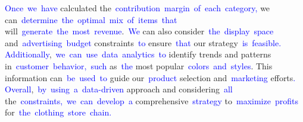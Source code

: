 \documentclass{article}
\begin{document}
\begin{tcolorbox}[colframe=black,colback=white]
{}\textcolor{blue}{Once}\textcolor{blue}{~we}\textcolor{blue}{~have} calculated the\textcolor{blue}{~contribution}\textcolor{blue}{~margin}\textcolor{blue}{~of}\textcolor{blue}{~each}\textcolor{blue}{~category}\textcolor{blue}{,} we can\textcolor{blue}{~determine}\textcolor{blue}{~the}\textcolor{blue}{~optimal}\textcolor{blue}{~mix}\textcolor{blue}{~of}\textcolor{blue}{~items}\textcolor{blue}{~that} will\textcolor{blue}{~generate}\textcolor{blue}{~the}\textcolor{blue}{~most}\textcolor{blue}{~revenue}.\textcolor{blue}{~We} can also consider\textcolor{blue}{~the}\textcolor{blue}{~display}\textcolor{blue}{~space} and\textcolor{blue}{~advertising}\textcolor{blue}{~budget} constraints\textcolor{blue}{~to} ensure\textcolor{blue}{~that} our strategy\textcolor{blue}{~is}\textcolor{blue}{~feasible}\textcolor{blue}{.
}\textcolor{blue}{Additionally},\textcolor{blue}{~we}\textcolor{blue}{~can}\textcolor{blue}{~use}\textcolor{blue}{~data}\textcolor{blue}{~analytics}\textcolor{blue}{~to} identify trends and patterns in\textcolor{blue}{~customer}\textcolor{blue}{~behavior}\textcolor{blue}{,}\textcolor{blue}{~such} as\textcolor{blue}{~the} most popular\textcolor{blue}{~colors}\textcolor{blue}{~and}\textcolor{blue}{~styles}. This information can\textcolor{blue}{~be}\textcolor{blue}{~used}\textcolor{blue}{~to} guide our\textcolor{blue}{~product} selection and\textcolor{blue}{~marketing} efforts\textcolor{blue}{.
}\textcolor{blue}{Overall},\textcolor{blue}{~by}\textcolor{blue}{~using}\textcolor{blue}{~a}\textcolor{blue}{~data}\textcolor{blue}{-driven} approach and considering\textcolor{blue}{~all} the\textcolor{blue}{~constraints}\textcolor{blue}{,}\textcolor{blue}{~we}\textcolor{blue}{~can}\textcolor{blue}{~develop}\textcolor{blue}{~a} comprehensive\textcolor{blue}{~strategy} to\textcolor{blue}{~maximize}\textcolor{blue}{~profits} for\textcolor{blue}{~the}\textcolor{blue}{~clothing}\textcolor{blue}{~store}\textcolor{blue}{~chain}\textcolor{blue}{.}\textcolor{blue}{}
\end{tcolorbox}
\end{document}
